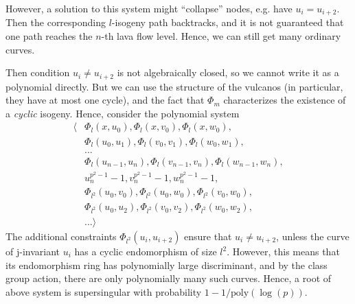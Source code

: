 However, a solution to this system might ``collapse'' nodes, e.g. have $u_i = u_{i + 2}$.
Then the corresponding $l$-isogeny path backtracks, and it is not guaranteed that one path reaches the $n$-th lava flow level.
Hence, we can still get many ordinary curves.

Then condition $u_i \neq u_{i + 2}$ is not algebraically closed, so we cannot write it as a polynomial directly.
But we can use the structure of the vulcanos (in particular, they have at most one cycle), and the fact that $\Phi_m$ characterizes the existence of a \emph{cyclic} isogeny.
Hence, consider the polynomial system
\begin{align*}
    \langle &\Phi_l(x, u_0), \Phi_l(x, v_0), \Phi_l(x, w_0), \\
    &\Phi_l(u_0, u_1), \Phi_l(v_0, v_1), \Phi_l(w_0, w_1), \\
    &... \\
    &\Phi_l(u_{n - 1}, u_n), \Phi_l(v_{n - 1}, v_n), \Phi_l(w_{n - 1}, w_n), \\
    &u_n^{p^2 - 1} - 1, v_n^{p^2 - 1} - 1, w_n^{p^2 - 1} - 1, \\
    &\Phi_{l^2}(u_0, v_0), \Phi_{l^2}(u_0, w_0), \Phi_{l^2}(v_0, w_0), \\
    &\Phi_{l^2}(u_0, u_2), \Phi_{l^2}(v_0, v_2), \Phi_{l^2}(w_0, w_2), \\
    &... \rangle
\end{align*}
The additional constraints $\Phi_{l^2}(u_i, u_{i + 2})$ ensure that $u_i \neq u_{i + 2}$, unless the curve of j-invariant $u_i$ has a cyclic endomorphism of size $l^2$.
However, this means that its endomorphism ring has polynomially large discriminant, and by the class group action, there are only polynomially many such curves.
Hence, a root of above system is supersingular with probability $1 - 1/\mathrm{poly}(\log(p))$. 

